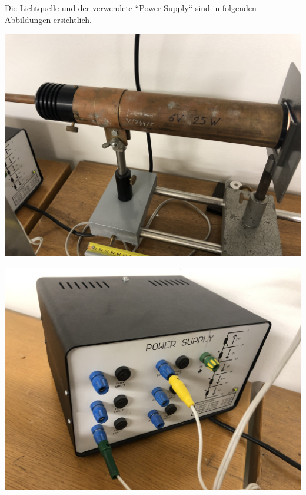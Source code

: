 \documentclass[11pt,ngerman]{scrartcl}
\begin{document}
Die Lichtquelle und der verwendete ``Power Supply`` sind in folgenden Abbildungen ersichtlich.

\vspace{2mm}

\begin{minipage}{\textwidth}
	\begin{minipage}[t]{0.5\textwidth}
		\centering
		\includegraphics[width=\textwidth]{lampe}
		\label{fig:lampe}
	\end{minipage}
	\vspace{2mm}
	\begin{minipage}[t]{0.50\textwidth}
		\centering
		\includegraphics[width=\textwidth]{power}
		\label{fig:power}
	\end{minipage}
	\vspace{1em}
\end{minipage}
\end{document}
